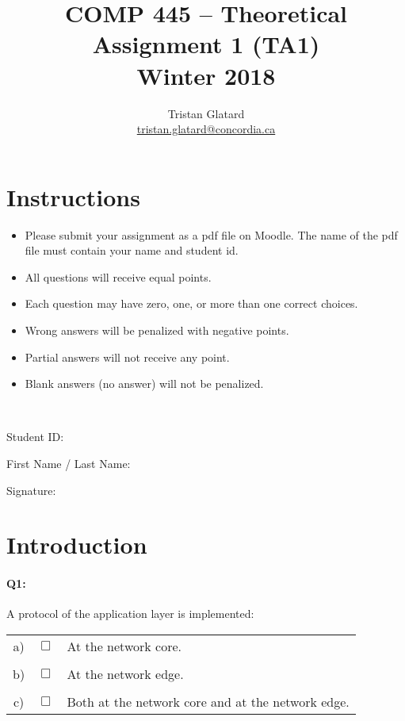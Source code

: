 \documentclass{llncs}
\title{COMP 445 -- Theoretical Assignment 1 (TA1)\\ Winter 2018}
\author{Tristan Glatard\\
  \href{mailto:tristan.glatard@concordia.ca}{tristan.glatard@concordia.ca}
}
\institute{Concordia University\\
  Department of Computer Science and Software Engineering}
\newcommand{\myspace}[0]{\vspace*{0.25cm}}
\begin{document}
\maketitle

\section*{Instructions}

\begin{itemize}
\item Please submit your assignment  as a pdf file on Moodle. The name of the pdf file must contain your name and student id. 
\item All questions will receive equal points.
\item Each question may have zero, one, or more than one
  correct choices.
\item Wrong answers will be penalized with negative
  points.
\item Partial answers will not
  receive any point.
\item Blank answers (no answer) will not be penalized.
\end{itemize}

\hrulefill\\

\myspace

\myspace

Student ID: \dotfill

\myspace

\myspace

First Name / Last Name: \dotfill

\myspace

\myspace

Signature: \dotfill

\myspace

\myspace

\hrulefill

\newpage

\section*{Introduction}

\paragraph{\textbf{Q1:}} A protocol of the application layer is implemented:\\

\begin{tabular}{ccl}
  a) & $\Box$ & At the network core. \\
  \\
  b) & $\Box$ & At the network edge. \\
  \\
  c) & $\Box$ & Both at the network core and at the network edge. 
\end{tabular}
\end{document}
